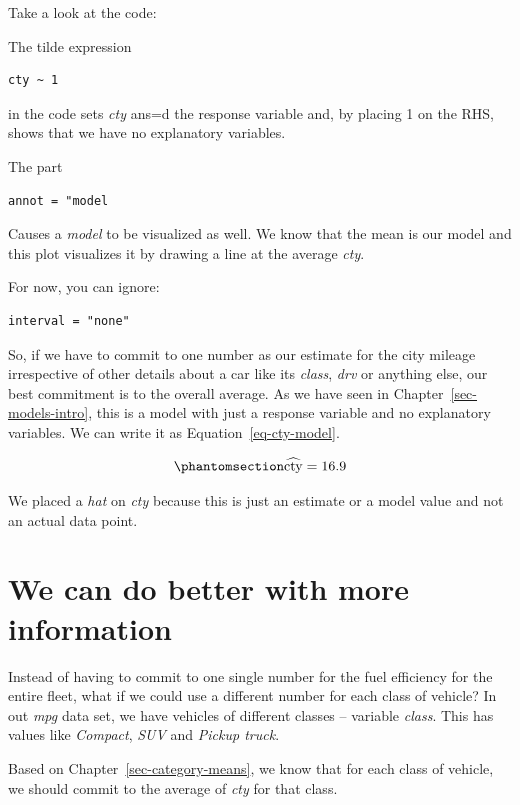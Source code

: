 \documentclass[
  12pt,
  letterpaper,
  DIV=11,
  numbers=noendperiod]{scrreprt}
\begin{document}
Take a look at the code:

The tilde expression

\begin{lstlisting}
cty ~ 1
\end{lstlisting}

in the code sets \emph{cty} ans=d the response variable and, by placing
1 on the RHS, shows that we have no explanatory variables.

The part

\begin{lstlisting}
annot = "model
\end{lstlisting}

Causes a \emph{model} to be visualized as well. We know that the mean is
our model and this plot visualizes it by drawing a line at the average
\emph{cty}.

For now, you can ignore:

\begin{lstlisting}
interval = "none"
\end{lstlisting}

So, if we have to commit to one number as our estimate for the city
mileage irrespective of other details about a car like its \emph{class},
\emph{drv} or anything else, our best commitment is to the overall
average. As we have seen in Chapter~\ref{sec-models-intro}, this is a
model with just a response variable and no explanatory variables. We can
write it as Equation~\ref{eq-cty-model}.

\begin{equation}\phantomsection\label{eq-cty-model}{
\widehat{\text{cty}} = 16.9
}\end{equation}

We placed a \emph{hat} on \emph{cty} because this is just an estimate or
a model value and not an actual data point.

\section{We can do better with more
information}\label{we-can-do-better-with-more-information}

Instead of having to commit to one single number for the fuel efficiency
for the entire fleet, what if we could use a different number for each
class of vehicle? In out \emph{mpg} data set, we have vehicles of
different classes -- variable \emph{class}. This has values like
\emph{Compact}, \emph{SUV} and \emph{Pickup truck}.

Based on Chapter~\ref{sec-category-means}, we know that for each class
of vehicle, we should commit to the average of \emph{cty} for that
class.
\end{document}
